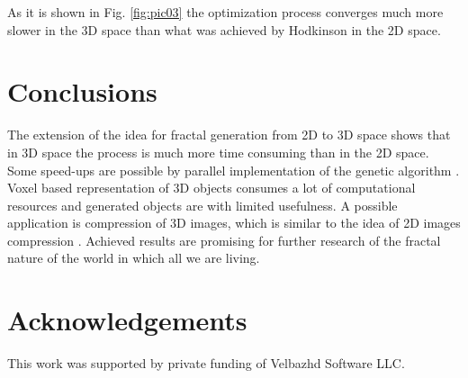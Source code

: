 \documentclass{llncs}
\begin{document}
As it is shown in Fig. \ref{fig:pic03} the optimization process converges much more slower in the 3D space than what was achieved by Hodkinson in the 2D space.

\section{Conclusions} \label{Conclusions}

The extension of the idea for fractal generation from 2D to 3D space shows that in 3D space the process is much more time consuming than in the 2D space. Some speed-ups are possible by parallel implementation of the genetic algorithm \cite{shonkwiler02}. Voxel based representation of 3D objects consumes a lot of computational resources and generated objects are with limited usefulness. A possible application is compression of 3D images, which is similar to the idea of 2D images compression \cite{vences01,albundi01}. Achieved results are promising for further research of the fractal nature of the world in which all we are living. 

\section*{Acknowledgements}
This work was supported by private funding of Velbazhd Software LLC.
\end{document}
